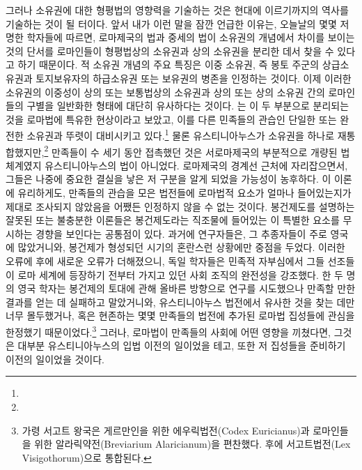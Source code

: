 그러나 소유권에 대한 형평법의 영향력을 기술하는 것은
현대에 이르기까지의 역사를 기술하는 것이 될 터이다.
앞서 내가 이런 말을 잠깐 언급한 이유는,
오늘날의 몇몇 저명한 학자들에 따르면,
로마제국의 법과 중세의 법이 소유권의 개념에서 차이를 보이는 것의 단서를
로마인들이 형평법상의 소유권과 상의 소유권을 분리한 데서
찾을 수 있다고 하기 때문이다.
적 소유권 개념의 주요 특징은
이중 소유권,
즉 봉토 주군의 상급소유권과
토지보유자의 하급소유권 또는 보유권의
병존을 인정하는 것이다.
이제 이러한 소유권의 이중성이
상의 또는 보통법상의 소유권과
상의 또는 상의 소유권 간의
로마인들의
구별을
일반화한 형태에 대단히 유사하다는 것이다.
는
이 두 부분으로 분리되는 것을
로마법에 특유한 현상이라고 보았고,
이를 다른 민족들의 관습인
단일한 또는 완전한 소유권과 뚜렷이
대비시키고 있다.\footnote{%
   }
물론
유스티니아누스가 소유권을
하나로 재통합했지만,\footnote{%
  }
만족들이 수 세기 동안 접촉했던 것은
서로마제국의 부분적으로 개량된 법체계였지
유스티니아누스의 법이 아니었다.
로마제국의 경계선 근처에 자리잡으면서,
그들은
나중에 중요한 결실을 낳은
저 구분을 알게 되었을 가능성이 농후하다.
이 이론에 유리하게도,
만족들의 관습을 모은 법전들에
로마법적 요소가 얼마나 들어있는지가
제대로 조사되지 않았음을
어쨌든 인정하지 않을 수 없는 것이다.
봉건제도를 설명하는 잘못된 또는 불충분한 이론들은
봉건제도라는 직조물에 들어있는
이 특별한 요소를 무시하는 경향을 보인다는 공통점이 있다.
과거에 연구자들은,
그 추종자들이 주로 영국에 많았거니와,
봉건제가 형성되던 시기의 혼란스런 상황에만 중점을 두었다.
이러한 오류에 후에 새로운 오류가 더해졌으니,
독일 학자들은
민족적 자부심에서
그들 선조들이 로마 세계에 등장하기 전부터
가지고 있던 사회 조직의 완전성을 강조했다.
한 두 명의 영국 학자는
봉건제의 토대에 관해
올바른 방향으로 연구를
시도했으나
만족할 만한 결과를 얻는 데 실패하고 말았거니와,
유스티니아누스 법전에서 유사한 것을 찾는 데만 너무 몰두했거나,
혹은 현존하는 몇몇 만족들의 법전에 추가된
로마법 집성들에 관심을 한정했기 때문이었다.\footnote{%
  가령 서고트 왕국은 게르만인을 위한 에우릭법전(Codex Euricianus)과
  로마인들을 위한 알라릭약전(Breviarium Alaricianum)을 편찬했다. 후에
  서고트법전(Lex Visigothorum)으로 통합된다. }
그러나,
로마법이 만족들의 사회에 어떤 영향을 끼쳤다면,
그것은
대부분
유스티니아누스의 입법 이전의 일이었을 테고,
또한 저 집성들을 준비하기 이전의 일이었을 것이다.
